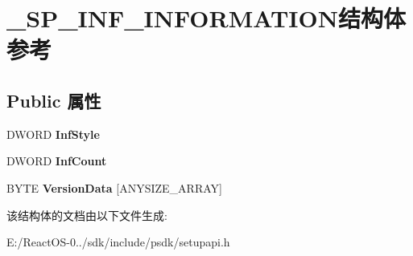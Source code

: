 \hypertarget{struct___s_p___i_n_f___i_n_f_o_r_m_a_t_i_o_n}{}\section{\+\_\+\+S\+P\+\_\+\+I\+N\+F\+\_\+\+I\+N\+F\+O\+R\+M\+A\+T\+I\+O\+N结构体 参考}
\label{struct___s_p___i_n_f___i_n_f_o_r_m_a_t_i_o_n}
\subsection*{Public 属性}
\begin{DoxyCompactItemize}
\item 
\mbox{\label{struct___s_p___i_n_f___i_n_f_o_r_m_a_t_i_o_n_af569c2d3ab5fd679fd9018ae72fe66ed}} 
D\+W\+O\+RD {\bfseries Inf\+Style}
\item 
\mbox{\label{struct___s_p___i_n_f___i_n_f_o_r_m_a_t_i_o_n_abfaa5f135828384782d0485cdcfc3820}} 
D\+W\+O\+RD {\bfseries Inf\+Count}
\item 
\mbox{\label{struct___s_p___i_n_f___i_n_f_o_r_m_a_t_i_o_n_a506f8d142f0a16d807a4761c20f92e2c}} 
B\+Y\+TE {\bfseries Version\+Data} \mbox{[}A\+N\+Y\+S\+I\+Z\+E\+\_\+\+A\+R\+R\+AY\mbox{]}
\end{DoxyCompactItemize}


该结构体的文档由以下文件生成\+:\begin{DoxyCompactItemize}
\item 
E\+:/\+React\+O\+S-\/0../sdk/include/psdk/setupapi.\+h\end{DoxyCompactItemize}
